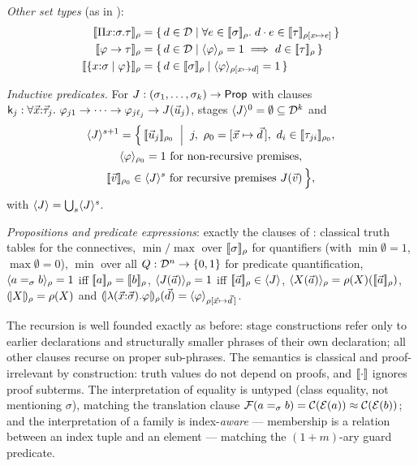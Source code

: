 \begin{definition}[Interpretations]
\emph{Other set types} (as in \cite{Extraction2026}):
\begin{align*}
  \semr{\Pi x{:}\sigma.\tau}{\rho} &=
    \{\, d \in \Dom \mid \forall e \in \semr{\sigma}{\rho}.\;
      d \cdot e \in \semr{\tau}{\rho[x \mapsto e]} \,\}\\
  \semr{\varphi \to \tau}{\rho} &=
    \{\, d \in \Dom \mid \pvr{\varphi}{\rho} = 1 \implies d \in
      \semr{\tau}{\rho} \,\}\\
  \semr{\refty{x{:}\sigma}{\varphi}}{\rho} &=
    \{\, d \in \semr{\sigma}{\rho} \mid \pvr{\varphi}{\rho[x \mapsto d]}
      = 1 \,\}
\end{align*}

\emph{Inductive predicates.}  For $J : (\sigma_1, \dots, \sigma_k) \to
\mathsf{Prop}$ with clauses $\mathsf{k}_j : \forall \vec{x}{:}\vec{\tau}_j.\
\varphi_{j1} \to \dots \to \varphi_{j\ell_j} \to J(\vec{u}_j)$, stages
$\langle J \rangle^0 = \emptyset \subseteq \mathcal{D}^k$ and
\begin{multline*}
  \pv{J}^{s+1} = \Bigl\{\, \sem{\tup{u}_j}_{\rho_0} \;\Bigm|\;
    j,\ \rho_0 = [\tup{x} \mapsto \tup{d}\,],\
    d_i \in \semr{\tau_{ji}}{\rho_0},\\
    \pvr{\varphi}{\rho_0} = 1 \text{ for non-recursive premises},\\
    \sem{\tup{v}}_{\rho_0} \in \pv{J}^s \text{ for recursive premises }
    J(\tup{v}) \,\Bigr\},
\end{multline*}
with $\langle J \rangle = \bigcup_s \langle J \rangle^s$.

\emph{Propositions and predicate expressions}: exactly the clauses of
\cite{Extraction2026}: classical truth tables for the connectives,
$\min/\max$ over $[\![ \sigma ]\!]_{\rho}$ for quantifiers (with $\min
\emptyset = 1$, $\max \emptyset = 0$), $\min$ over all $Q : \mathcal{D}^n \to
\{0,1\}$ for predicate quantification, $\langle a =_\sigma b \rangle_{\rho} = 1$
iff $[\![ a ]\!]_\rho = [\![ b ]\!]_\rho$, $\langle J(\vec{a}) \rangle_{\rho} = 1$ iff
$[\![ \vec{a} ]\!]_\rho \in \langle J \rangle$, $\langle X(\vec{a}) \rangle_{\rho} =
\rho(X)([\![ \vec{a} ]\!]_\rho)$, $(\!| X |\!)_\rho = \rho(X)$ and
$(\!| \lambda(\vec{x}{:}\vec{\sigma}).\varphi |\!)_\rho(\vec{d}) =
\langle \varphi \rangle_{\rho[\vec{x} \mapsto \vec{d}\,]}$.
\end{definition}

The recursion is well founded exactly as before: stage constructions
refer only to earlier declarations and structurally smaller phrases of
their own declaration; all other clauses recurse on proper sub-phrases.
The semantics is classical and proof-irrelevant by construction: truth
values do not depend on proofs, and $[\![ \cdot ]\!]$ ignores proof
subterms.  The interpretation of equality is untyped (class equality,
not mentioning $\sigma$), matching the translation clause $\mathcal{F}(a
=_\sigma b) = \mathcal{C}(\mathcal{E}(a)) \approx \mathcal{C}(\mathcal{E}(b))$; and the
interpretation of a family is index-\emph{aware} --- membership is a
relation between an index tuple and an element --- matching the
$(1{+}m)$-ary guard predicate.

